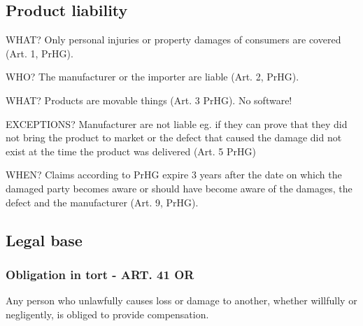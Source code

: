 \subsection{Product liability}
\begin{compactitem}
	\item WHAT? Only personal injuries or property damages of consumers are covered (Art. 1, PrHG).
	\item WHO? The manufacturer or the importer are liable (Art. 2, PrHG).
	\item WHAT? Products are movable things (Art. 3 PrHG). No software!
	\item EXCEPTIONS? Manufacturer are not liable eg. if they can prove that they did not bring the product to market or the defect that caused the damage did not exist at the time the product was delivered (Art. 5 PrHG)
	\item WHEN? Claims according to PrHG expire 3 years after the date on which the damaged party becomes aware or should have become aware of the damages, the defect and the manufacturer (Art. 9, PrHG).
\end{compactitem}

\subsection{Legal base}
\subsubsection{Obligation in tort - ART. 41 OR}
Any person who unlawfully causes loss or damage to another, whether willfully or negligently, is obliged to provide compensation.

